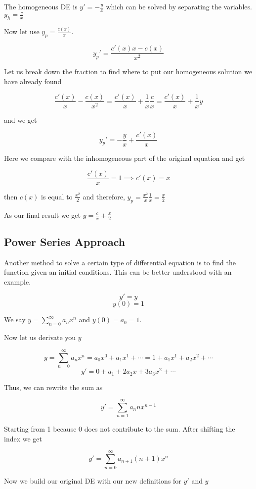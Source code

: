 The homogeneous DE is \(y' = -\frac{y}{x}\) which can be solved by separating the variables.
\(y_h = \frac{c}{x}\)

Now let use \(y_p = \frac{c(x)}{x}\).

\[
y_{p}' = \frac{c'(x)x - c(x)}{x^2}
\]

Let us break down the fraction to find where to put our homogeneous solution we have already found

\[
\frac{c'(x)}{x} - \frac{c(x)}{x^2} = \frac{c'(x)}{x} + \frac{1}{x}\frac{c}{x} = \frac{c'(x)}{x} + \frac{1}{x}y
\]

and we get

\[
y_{p}' = -\frac{y}{x} + \frac{c'(x)}{x} 
\]

Here we compare with the inhomogeneous part of the original equation and get

\[
\frac{c'(x)}{x} = 1 \implies c'(x) = x
\]

then \(c(x)\) is equal to \(\frac{x^2}{2}\) and therefore, \(y_p = \frac{x^2}{x}\frac{1}{x} = \frac{x}{2}\)
\vspace{\baselineskip}

As our final result we get \(y = \frac{c}{x} + \frac{x}{2}\)

\subsection{Power Series Approach}

Another method to solve a certain type  of differential equation
is to find the function given an initial conditions. This can be better understood with an example.

\[y' = y\]
\[y(0) = 1\]

We say \(y = \sum_{n = 0}^{\infty} a_n x^n\) and \(y(0) = a_0 = 1\).

Now let us derivate you \(y\)

\[
y = \sum_{n = 0}^{\infty} a_n x^n = a_0 x^0 + a_1 x^1 + \cdots = 1 + a_1 x^1 + a_2 x^2 + \cdots
\]
\[
y' = 0  + a_1 + 2 a_2 x + 3 a_3 x^2 + \cdots 
\]

Thus, we can rewrite the sum as 

\[
y' = \sum_{n = 1}^{\infty} a_n n x^{n - 1}
\]

Starting from 1 because 0 does not contribute to the sum. After shifting the index we get

\[
y' = \sum_{n = 0}^{\infty} a_{n + 1}(n + 1)x^{n}
\]

Now we build our original DE with our new definitions for \(y'\) and \(y\)

